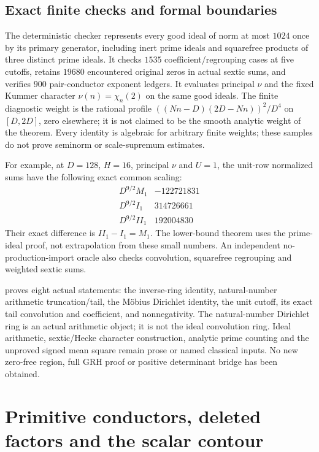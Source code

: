 \documentclass[11pt]{article}
\theoremstyle{definition}\newtheorem{definition}[theorem]{Definition}
\theoremstyle{remark}\newtheorem{remark}[theorem]{Remark}
\begin{document}
\subsection{Exact finite checks and formal boundaries}
The deterministic checker represents every good ideal of norm at most
$1024$ once by its primary generator, including inert prime ideals and
squarefree products of three distinct prime ideals.
It checks $1535$ coefficient/regrouping cases at five cutoffs, retains
$19680$ encountered original zeros in actual sextic sums, and verifies
$900$ pair-conductor exponent ledgers. It evaluates principal $\nu$ and
the fixed Kummer character $\nu(n)=\chi_n(2)$ on the same good ideals.
The finite diagnostic weight is the rational profile
$((Nn-D)(2D-Nn))^2/D^4$ on $[D,2D]$, zero elsewhere; it is not claimed
to be the smooth analytic weight of the theorem. Every identity is
algebraic for arbitrary finite weights; these samples do not prove
seminorm or scale-supremum estimates.

For example, at $D=128$, $H=16$, principal $\nu$ and $U=1$, the unit-row
normalized sums have the following exact common scaling:
\[
\begin{array}{c|r}
 D^{9/2}M_1&-122721831\\
 D^{9/2}I_1&314726661\\
 D^{9/2}II_1&192004830
\end{array}
\]
Their exact difference is $II_1-I_1=M_1$. The lower-bound theorem uses
the prime-ideal proof, not extrapolation from these small numbers.
An independent no-production-import oracle also checks convolution,
squarefree regrouping and weighted sextic sums.

 proves eight actual statements: the inverse-ring
identity, natural-number arithmetic truncation/tail, the M\"obius Dirichlet
identity, the unit cutoff, its exact tail convolution and coefficient,
and nonnegativity. The natural-number Dirichlet ring is an actual
arithmetic object; it is not the ideal convolution ring. Ideal arithmetic,
sextic/Hecke character construction, analytic prime counting and the
unproved signed mean square remain prose or named classical inputs.
No new zero-free region, full GRH proof or positive determinant bridge
has been obtained.

\section{Primitive conductors, deleted factors and the scalar contour}
\label{hti:details}
\end{document}
